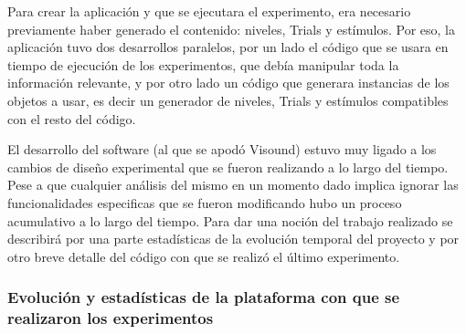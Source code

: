 \documentclass{article}
\numberwithin{figure}{section}
\begin{document}
    Para crear la aplicación y que se ejecutara el experimento, era necesario previamente haber generado el contenido: niveles, Trials y estímulos. Por eso, la aplicación tuvo dos desarrollos paralelos, por un lado el código que se usara en tiempo de ejecución de los experimentos, que debía manipular toda la información relevante, y por otro lado un código que generara instancias de los objetos a usar, es decir un generador de niveles, Trials y estímulos compatibles con el resto del código.
    
    El desarrollo del software (al que se apodó Visound) estuvo muy ligado a los cambios de diseño experimental que se fueron realizando a lo largo del tiempo. Pese a que cualquier análisis del mismo en un momento dado implica ignorar las funcionalidades especificas que se fueron modificando hubo un proceso acumulativo a lo largo del tiempo. Para dar una noción del trabajo realizado se describirá por una parte estadísticas de la evolución temporal del proyecto y por otro breve detalle del código con que se realizó el último experimento. 
    
    \subsubsection{Evolución y estadísticas de la plataforma con que se realizaron los experimentos}
    
\end{document}
